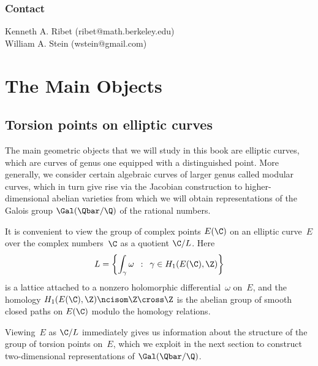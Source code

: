 \documentclass{report}
\begin{document}


\subsection*{Contact}

\vspace{5ex}
\noindent
Kenneth A. Ribet ({\sf ribet@math.berkeley.edu})\\
William A. Stein ({\sf wstein@gmail.com})

\chapter{The Main Objects}

\section{Torsion points on elliptic curves}

  The main geometric
objects that we will study in this book are elliptic curves, which are
curves of genus one equipped with a distinguished point.  More
generally, we consider certain algebraic curves of larger genus called
modular curves, which in turn give rise via the Jacobian construction
to higher-dimensional abelian varieties from which we will obtain
representations of the Galois group $\Gal(\Qbar/\Q)$ of the rational
numbers.

It is convenient to view the group of complex points $E(\C)$ on an
elliptic curve~$E$ over the complex numbers~$\C$ as a quotient $\C/L$.
Here
\begin{equation*}
L = \left\{\int_{\gamma} \omega
            \,\,\, :\,\, \, \gamma\in H_1(E(\C),\Z)\right\}
\end{equation*}
is a lattice attached to a nonzero
holomorphic differential~$\omega$ on~$E$, and
the homology $H_1(E(\C),\Z)\ncisom \Z\cross\Z$ is the abelian group of
smooth closed paths on $E(\C)$ modulo the homology relations.

Viewing~$E$ as $\C/L$ immediately gives us information about the
structure of the group of torsion points on~$E$, which we
exploit in the next section to construct two-dimensional
representations of $\Gal(\Qbar/\Q)$.
\end{document}
